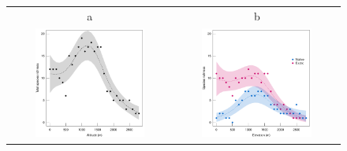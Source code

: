 \documentclass{article}
\begin{document}
\begin{figure}
\hspace{-2cm}
\begin{tabular}{cc}
a& b\\
\includegraphics[width=0.7\textwidth]{figures/zoizos-Stot}
&
\includegraphics[width=0.7\textwidth]{figures/zoizos-Snatexo}
\end{tabular}
\caption{\label{Sgam}}
\end{figure}

\clearpage


\end{document}
